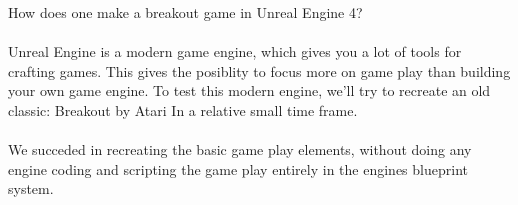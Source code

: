 How does one make a breakout game in Unreal Engine 4?\\
\\
Unreal Engine is a modern game engine, which gives you a lot of tools for crafting games. This gives the posiblity to focus more on game play than building your own game engine. To test this modern engine, we'll try to recreate an old classic: Breakout by Atari In a relative small time frame.\\
\\
We succeded in recreating the basic game play elements, without doing any engine coding and scripting the game play entirely in the engines blueprint system.